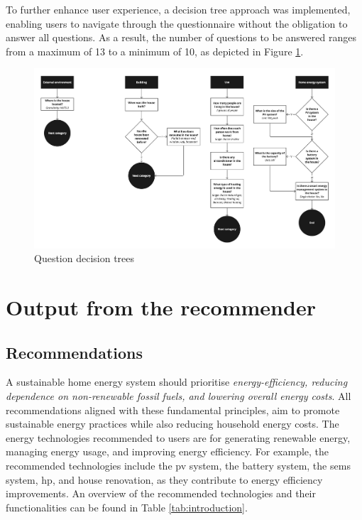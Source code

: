 To further enhance user experience, a decision tree approach was implemented, enabling users to navigate through the questionnaire without the obligation to answer all questions.
As a result, the number of questions to be answered ranges from a maximum of 13 to a minimum of 10, as depicted in Figure \ref{fig:trees}. 
\begin{figure}[h!]
  \centering
  \includegraphics[width=\textwidth]{Images/trees.jpg}
  \caption{Question decision trees}
  \label{fig:trees}
\end{figure}


\section{Output from the recommender}


\subsection{Recommendations}

A sustainable home energy system should prioritise \emph{energy-efficiency, reducing dependence on non-renewable fossil fuels, and lowering overall energy costs}. 
All recommendations aligned with these fundamental principles, 
aim to promote sustainable energy practices while also reducing household energy costs. 
The energy technologies recommended to users are for generating renewable energy, managing energy usage, and improving energy efficiency. 
For example, the recommended technologies include the \gls{pv} system, the battery system, the \gls{sems} system, \gls{hp}, and house renovation, as they contribute to energy efficiency improvements.
An overview of the recommended technologies and their functionalities can be found in Table \ref{tab:introduction}.


